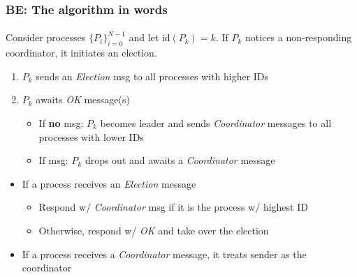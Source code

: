 \begin{frame}
\frametitle{BE: The algorithm in words}
\framesubtitle{}
Consider processes $\{ P_i \}_{i=0}^{N-1}$ and let id$(P_k) = k$. If
$P_k$ notices a non-responding coordinator, it initiates an election.
\begin{enumerate}
\item $P_k$ sends an \textit{Election} msg to all processes with
  higher IDs%
\item $P_k$ awaits \textit{OK} message(s)
  \begin{itemize}
  \item If \textbf{no} msg: $P_k$ becomes leader and sends
    \textit{Coordinator} messages to all processes with lower IDs
  \item If msg: $P_k$ drops out and awaits a \textit{Coordinator} message
  \end{itemize}
\end{enumerate}
\begin{itemize}
\item If a process receives an \textit{Election} message
  \begin{itemize}
  \item Respond w/ \textit{Coordinator} msg if it is the process w/ highest ID
  \item Otherwise, respond w/ \textit{OK} and take over the election
  \end{itemize}
\item If a process receives a \textit{Coordinator} message, it treats  sender as the coordinator
\end{itemize}
\end{frame}


